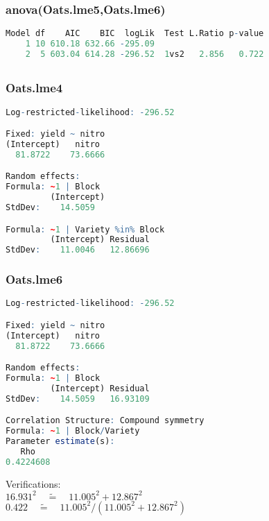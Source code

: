 \documentclass[a4paper,12pt]{article}
\begin{document}
	\subsubsection*{anova(Oats.lme5,Oats.lme6)}
	\begin{lstlisting}[language=R]
Model df    AIC    BIC  logLik  Test L.Ratio p-value
    1 10 610.18 632.66 -295.09                        
    2  5 603.04 614.28 -296.52  1vs2   2.856   0.722
	\end{lstlisting}
	
	\newpage
	\subsection{}
	\subsubsection*{Oats.lme4}
	\begin{lstlisting}[language=R]
Log-restricted-likelihood: -296.52

Fixed: yield ~ nitro
(Intercept)   nitro 
  81.8722    73.6666

Random effects:
Formula: ~1 | Block
         (Intercept)
StdDev:    14.5059

Formula: ~1 | Variety %in% Block
         (Intercept) Residual
StdDev:    11.0046   12.86696
	\end{lstlisting}
	
	\subsubsection*{Oats.lme6}
	\begin{lstlisting}[language=R]
Log-restricted-likelihood: -296.52

Fixed: yield ~ nitro
(Intercept)   nitro 
  81.8722    73.6666

Random effects:
Formula: ~1 | Block
         (Intercept) Residual
StdDev:    14.5059   16.93109

Correlation Structure: Compound symmetry
Formula: ~1 | Block/Variety 
Parameter estimate(s):
   Rho 
0.4224608
	\end{lstlisting}
	
	\newpage
	Verifications:\\[1em]
	$ 16.931^2 \quad\tilde{=}\quad 11.005^2 + 12.867^2 $ \\
	$ 0.422 \quad\tilde{=}\quad 11.005^2 / (11.005^2 + 12.867^2) $ 
	
	\subsection{}
\end{document}
